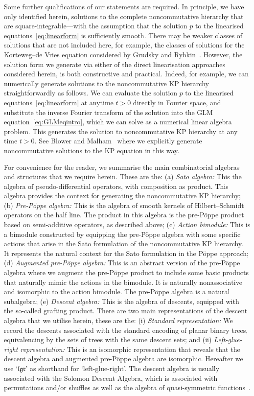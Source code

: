 \documentclass[5p,twocolumn]{elsarticle}
\newcommand*{\el}{\mathfrak l}
\newcommand*{\gl}{\mathfrak g}
\newcommand*{\rl}{\mathfrak r}
\begin{document}
Some further qualifications of our statements are required.
In principle, we have only identified herein, solutions to the complete noncommutative hierarchy that are square-integrable---with the assumption that
the solution $p$ to the linearised equations~\eqref{eq:linearform} is sufficiently smooth.  
There may be weaker classes of solutions that are not included here, for example, the classes of solutions for the Korteweg--de Vries equation considered by Grudsky and Rybkin~\cite{GR}. 
However, the solution form we generate via either of the direct linearisation approaches considered herein, is both constructive and practical.
Indeed, for example, we can numerically generate solutions to the noncommutative KP hierarchy straightforwardly as follows.
We can evaluate the solution $p$ to the linearised equations~\eqref{eq:linearform} at anytime $t>0$ directly in Fourier space,
and substitute the inverse Fourier transform of the solution into the GLM equation~\eqref{eq:GLMeqintro}, which we can solve as a numerical linear algebra problem.
This generates the solution to noncommutative KP hierarchy at any time $t>0$.
See Blower and Malham~\cite{BM-KP} where we explicitly generate noncommutative solutions to the KP equation in this way. 

For convenience for the reader, we summarise the main combinatorial algebras and structures that we require herein. These are the:
(a) \emph{Sato algebra:} This the algebra of pseudo-differential operators, with composition as product.
This algebra provides the context for generating the noncommutative KP hierarchy;
(b) \emph{Pre-P\"oppe algebra:} This is the algebra of smooth kernels of Hilbert--Schmidt operators on the half line. 
The product in this algebra is the pre-P\"oppe product based on semi-additive operators, as described above; 
(c) \emph{Action bimodule:} This is a bimodule constructed by equipping the pre-P\"oppe algebra with some specific actions that arise in the Sato formulation of the noncommutative KP hierarchy.
It represents the natural context for the Sato formulation in the P\"oppe approach;
(d) \emph{Augmented pre-P\"oppe algebra:}
This is an abstract version of the pre-P\"oppe algebra where we augment the pre-P\"oppe product to include some basic products that naturally mimic the actions in the bimodule.
It is naturally nonassociative and isomorphic to the action bimodule. The pre-P\"oppe algebra is a natural subalgebra;
(e) \emph{Descent algebra:} This is the algebra of descents, equipped with the so-called grafting product.
There are two main representations of the descent algebra that we utilise herein, these are the:
(i) \emph{Standard representation:} We record the descents associated with the standard encoding of planar binary trees, equivalencing by the sets of trees with the same descent sets; and
(ii) \emph{Left-glue-right representation:} This is an isomorphic representation that reveals that the descent algebra and augmented pre-P\"oppe algebra are isomorphic.
Hereafter we use `$\el\gl\rl$' as shorthand for `left-glue-right'.    
The descent algebra is usually associated with the Solomon Descent Algebra, which is associated with permutations and/or shuffles as well as the algebra of quasi-symmetric functions~\cite{MR,FMP}.
\end{document}
